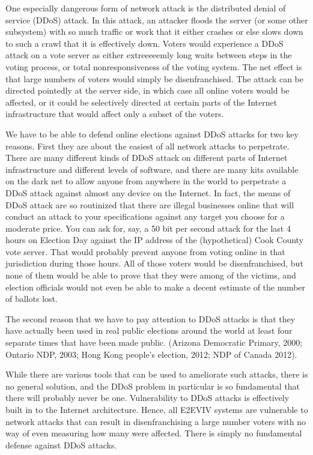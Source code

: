 One especially dangerous form of network attack is the distributed
denial of service (DDoS) attack.  In this attack, an attacker floods
the server (or some other subsystem) with so much traffic or work that
it either crashes or else slows down to such a crawl that it is
effectively down. Voters would experience a DDoS attack on a vote
server as either extreeeeemly long waits between steps in the voting
process, or total nonresponsiveness of the voting system. The net
effect is that large numbers of voters would simply be
disenfranchised. The attack can be directed pointedly at the server
side, in which case all online voters would be affected, or it could
be selectively directed at certain parts of the Internet
infrastructure that would affect only a subset of the voters.

We have to be able to defend online elections against DDoS attacks for
two key reasons.  First they are about the easiest of all network
attacks to perpetrate. There are many different kinds of DDoS attack
on different parts of Internet infrastructure and different levels of
software, and there are many kits available on the dark net to allow
anyone from anywhere in the world to perpetrate a DDoS attack against
almost any device on the Internet. In fact, the means of DDoS attack
are so routinized that there are illegal businesses online that will
conduct an attack to your specifications against any target you choose
for a moderate price. You can ask for, say, a 50 bit per second attack
for the last 4 hours on Election Day against the IP address of the
(hypothetical) Cook County vote server. That would probably prevent
anyone from voting online in that jurisdiction during those hours. All
of those voters would be disenfranchised, but none of them would be
able to prove that they were among of the victims, and election
officials would not even be able to make a decent estimate of the
number of ballots lost.

The second reason that we have to pay attention to DDoS attacks is
that they have actually been used in real public elections around the
world at least four separate times that have been made
public. (Arizona Democratic Primary, 2000; Ontario NDP, 2003; Hong
Kong people's election, 2012; NDP of Canada 2012).

While there are various tools that can be used to ameliorate such
attacks, there is no general solution, and the DDoS problem in
particular is so fundamental that there will probably never be
one. Vulnerability to DDoS attacks is effectively built in to the
Internet architecture. Hence, all E2EVIV systems are vulnerable to
network attacks that can result in disenfranchising a large number
voters with no way of even measuring how many were affected. There is
simply no fundamental defense against DDoS attacks.

